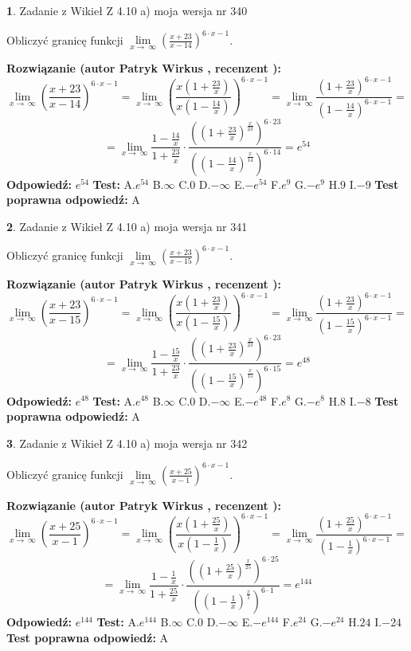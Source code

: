 \documentclass[12pt, a4paper]{article}
\theoremstyle{definition} %
\newtheorem{zad}{}
\newcommand{\zadStart}[1]{\begin{zad}#1\newline}
\newcommand{\zadStop}{\end{zad}}
\newcommand{\rozwStart}[2]{\noindent \textbf{Rozwiązanie (autor #1 , recenzent #2): }\newline}
\newcommand{\rozwStop}{\newline}
\newcommand{\odpStart}{\noindent \textbf{Odpowiedź:}\newline}
\newcommand{\odpStop}{\newline}
\newcommand{\testStart}{\noindent \textbf{Test:}\newline}
\newcommand{\testStop}{\newline}
\newcommand{\kluczStart}{\noindent \textbf{Test poprawna odpowiedź:}\newline}
\newcommand{\kluczStop}{\newline}
\begin{document}
\zadStart{Zadanie z Wikieł Z 4.10 a) moja wersja nr 340}

Obliczyć granicę funkcji  $\lim\limits_{x\to\ \infty}(\frac{x+23}{x-14})^{6\cdot x-1}$.
\zadStop
\rozwStart{Patryk Wirkus}{}
$$\lim\limits_{x\to\ \infty}(\frac{x+23}{x-14})^{6\cdot x-1} = \lim\limits_{x\to\ \infty}(\frac{x(1+\frac{23}{x})}{x(1-\frac{14}{x})})^{6\cdot x-1}=\lim\limits_{x\to\ \infty}\frac{(1+\frac{23}{x})^{6\cdot x-1}}{(1-\frac{14}{x})^{6\cdot x-1}}=$$
$$=\lim\limits_{x\to\ \infty}\frac{1-\frac{14}{x}}{1+\frac{23}{x}}\cdot\frac{((1+\frac{23}{x})^{\frac{x}{23}})^{6\cdot23}}{((1-\frac{14}{x})^{\frac{x}{14}})^{6\cdot14}}=e^{54}$$
\rozwStop
\odpStart
$e^{54}$
\odpStop
\testStart
A.$e^{54}$ B.$\infty$ C.$0$ D.$-\infty$ E.$-e^{54}$
F.$e^{9}$ G.$-e^{9}$
H.$9$
I.$-9$
\testStop
\kluczStart
A
\kluczStop



\zadStart{Zadanie z Wikieł Z 4.10 a) moja wersja nr 341}

Obliczyć granicę funkcji  $\lim\limits_{x\to\ \infty}(\frac{x+23}{x-15})^{6\cdot x-1}$.
\zadStop
\rozwStart{Patryk Wirkus}{}
$$\lim\limits_{x\to\ \infty}(\frac{x+23}{x-15})^{6\cdot x-1} = \lim\limits_{x\to\ \infty}(\frac{x(1+\frac{23}{x})}{x(1-\frac{15}{x})})^{6\cdot x-1}=\lim\limits_{x\to\ \infty}\frac{(1+\frac{23}{x})^{6\cdot x-1}}{(1-\frac{15}{x})^{6\cdot x-1}}=$$
$$=\lim\limits_{x\to\ \infty}\frac{1-\frac{15}{x}}{1+\frac{23}{x}}\cdot\frac{((1+\frac{23}{x})^{\frac{x}{23}})^{6\cdot23}}{((1-\frac{15}{x})^{\frac{x}{15}})^{6\cdot15}}=e^{48}$$
\rozwStop
\odpStart
$e^{48}$
\odpStop
\testStart
A.$e^{48}$ B.$\infty$ C.$0$ D.$-\infty$ E.$-e^{48}$
F.$e^{8}$ G.$-e^{8}$
H.$8$
I.$-8$
\testStop
\kluczStart
A
\kluczStop



\zadStart{Zadanie z Wikieł Z 4.10 a) moja wersja nr 342}

Obliczyć granicę funkcji  $\lim\limits_{x\to\ \infty}(\frac{x+25}{x-1})^{6\cdot x-1}$.
\zadStop
\rozwStart{Patryk Wirkus}{}
$$\lim\limits_{x\to\ \infty}(\frac{x+25}{x-1})^{6\cdot x-1} = \lim\limits_{x\to\ \infty}(\frac{x(1+\frac{25}{x})}{x(1-\frac{1}{x})})^{6\cdot x-1}=\lim\limits_{x\to\ \infty}\frac{(1+\frac{25}{x})^{6\cdot x-1}}{(1-\frac{1}{x})^{6\cdot x-1}}=$$
$$=\lim\limits_{x\to\ \infty}\frac{1-\frac{1}{x}}{1+\frac{25}{x}}\cdot\frac{((1+\frac{25}{x})^{\frac{x}{25}})^{6\cdot25}}{((1-\frac{1}{x})^{\frac{x}{1}})^{6\cdot1}}=e^{144}$$
\rozwStop
\odpStart
$e^{144}$
\odpStop
\testStart
A.$e^{144}$ B.$\infty$ C.$0$ D.$-\infty$ E.$-e^{144}$
F.$e^{24}$ G.$-e^{24}$
H.$24$
I.$-24$
\testStop
\kluczStart
A
\kluczStop
\end{document}
